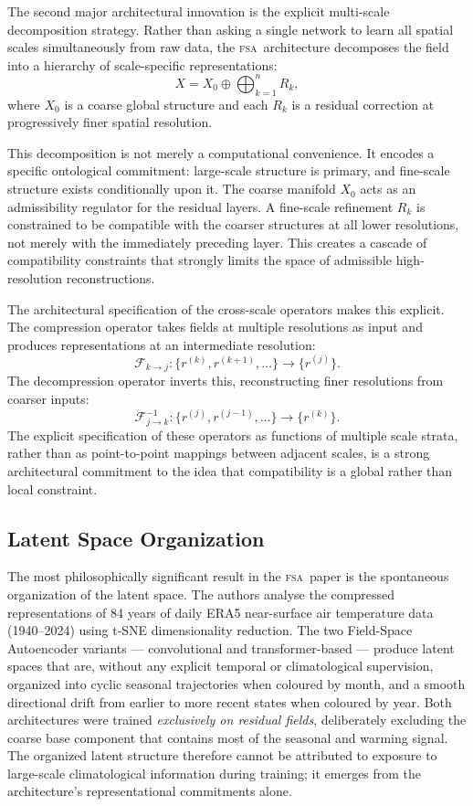 \documentclass[11pt,a4paper]{article}
\theoremstyle{plain}
\theoremstyle{definition}
\theoremstyle{remark}
\newcommand{\FSA}{\textup{\textsc{fsa}}}
\begin{document}
The second major architectural innovation is the explicit multi-scale
decomposition strategy. Rather than asking a single network to learn all
spatial scales simultaneously from raw data, the \FSA\ architecture
decomposes the field into a hierarchy of scale-specific representations:
\[
X = X_0 \oplus \bigoplus_{k=1}^{n} R_k,
\]
where $X_0$ is a coarse global structure and each $R_k$ is a residual
correction at progressively finer spatial resolution.

This decomposition is not merely a computational convenience. It encodes a
specific ontological commitment: large-scale structure is primary, and
fine-scale structure exists conditionally upon it. The coarse manifold
$X_0$ acts as an admissibility regulator for the residual layers. A
fine-scale refinement $R_k$ is constrained to be compatible with the
coarser structures at all lower resolutions, not merely with the
immediately preceding layer. This creates a cascade of compatibility
constraints that strongly limits the space of admissible high-resolution
reconstructions.

The architectural specification of the cross-scale operators makes this
explicit. The compression operator takes fields at multiple resolutions as
input and produces representations at an intermediate resolution:
\[
\mathcal{F}_{k \to j}:\{r^{(k)}, r^{(k+1)}, \ldots\} \to \{r^{(j)}\}.
\]
The decompression operator inverts this, reconstructing finer resolutions
from coarser inputs:
\[
\mathcal{F}^{-1}_{j \to k}:\{r^{(j)}, r^{(j-1)}, \ldots\} \to \{r^{(k)}\}.
\]
The explicit specification of these operators as functions of multiple
scale strata, rather than as point-to-point mappings between adjacent
scales, is a strong architectural commitment to the idea that compatibility
is a global rather than local constraint.

\subsection{Latent Space Organization}

The most philosophically significant result in the \FSA\ paper is the
spontaneous organization of the latent space. The authors analyse the
compressed representations of 84 years of daily ERA5 near-surface air
temperature data (1940--2024) using t-SNE dimensionality reduction. The
two Field-Space Autoencoder variants --- convolutional and transformer-based
--- produce latent spaces that are, without any explicit temporal or
climatological supervision, organized into cyclic seasonal trajectories
when coloured by month, and a smooth directional drift from earlier to
more recent states when coloured by year. Both architectures were trained
\textit{exclusively on residual fields}, deliberately excluding the coarse
base component that contains most of the seasonal and warming signal. The
organized latent structure therefore cannot be attributed to exposure to
large-scale climatological information during training; it emerges from the
architecture's representational commitments alone.
\end{document}
